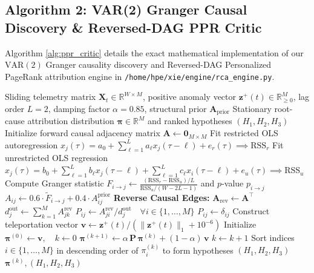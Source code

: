 \subsection*{Algorithm 2: VAR(2) Granger Causal Discovery \& Reversed-DAG PPR Critic}
Algorithm \ref{alg:ppr_critic} details the exact mathematical implementation of our $\text{VAR}(2)$ Granger causality discovery and Reversed-DAG Personalized PageRank attribution engine in \texttt{/home/hpe/xie/engine/rca\_engine.py}.

\begin{algorithm}[!htb]
\caption{VAR(2) Granger Causal Graph Discovery \& Reversed-DAG Personalized PageRank}
\label{alg:ppr_critic}
\begin{algorithmic}[1]
\Require Sliding telemetry matrix $\mathbf{X}_t \in \mathbb{R}^{W \times M}$, positive anomaly vector $\mathbf{z}^+(t) \in \mathbb{R}_{\ge 0}^M$, lag order $L = 2$, damping factor $\alpha = 0.85$, structural prior $\mathbf{A}_{\text{prior}}$
\Ensure Stationary root-cause attribution distribution $\boldsymbol{\pi} \in \mathbb{R}^M$ and ranked hypotheses $(H_1, H_2, H_3)$
\State Initialize forward causal adjacency matrix $\mathbf{A} \leftarrow \mathbf{0}_{M \times M}$
    \State Fit restricted OLS autoregression $x_j(\tau) = a_0 + \sum_{\ell=1}^{L} a_\ell x_j(\tau-\ell) + e_r(\tau) \implies \text{RSS}_r$
    \State Fit unrestricted OLS regression $x_j(\tau) = b_0 + \sum_{\ell=1}^{L} b_\ell x_j(\tau-\ell) + \sum_{\ell=1}^{L} c_\ell x_i(\tau-\ell) + e_u(\tau) \implies \text{RSS}_u$
    \State Compute Granger statistic $F_{i \to j} \leftarrow \frac{(\text{RSS}_r - \text{RSS}_u)/L}{\text{RSS}_u / (W - 2L - 1)}$ and $p$-value $p_{i \to j}$
        \State $A_{ij} \leftarrow 0.6 \cdot \tilde{F}_{i \to j} + 0.4 \cdot A_{ij}^{\text{prior}}$
    \EndIf
\EndFor
\State \textbf{Reverse Causal Edges:} $\mathbf{A}_{\text{rev}} \leftarrow \mathbf{A}^\top$ 
    \State $d_j^{\text{out}} \leftarrow \sum_{k=1}^{M} A_{jk}^{\text{rev}}$
        \State $P_{ij} \leftarrow A_{ji}^{\text{rev}} / d_j^{\text{out}} \quad \forall i \in \{1, \dots, M\}$
    \Else
        \State $P_{ij} \leftarrow \delta_{ij}$ 
    \EndIf
\EndFor
\State Construct teleportation vector $\mathbf{v} \leftarrow \mathbf{z}^+(t) / (\|\mathbf{z}^+(t)\|_1 + 10^{-6})$
\State Initialize $\boldsymbol{\pi}^{(0)} \leftarrow \mathbf{v}, \quad k \leftarrow 0$
\Repeat
    \State $\boldsymbol{\pi}^{(k+1)} \leftarrow \alpha \, \mathbf{P} \, \boldsymbol{\pi}^{(k)} + (1 - \alpha) \, \mathbf{v}$
    \State $k \leftarrow k + 1$
\State Sort indices $i \in \{1, \dots, M\}$ in descending order of $\pi_i^{(k)}$ to form hypotheses $(H_1, H_2, H_3)$
\State \Return $\boldsymbol{\pi}^{(k)}, (H_1, H_2, H_3)$
\end{algorithmic}
\end{algorithm}


